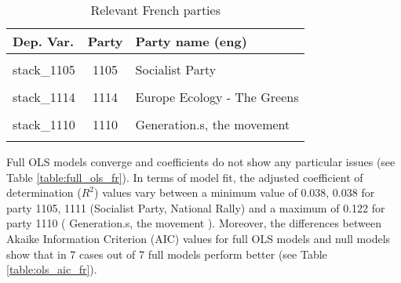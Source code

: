 \documentclass[
]{article}
\begin{document}
\begin{table}[!h]

\caption{\label{tab:unnamed-chunk-67}Relevant French parties \label{table:relprty_tab_fr}}
\centering
\begin{tabular}[t]{lcl}
\toprule
Dep. Var. & Party & Party name (eng)\\
\midrule
\cellcolor{gray!6}{stack\_1113} & \cellcolor{gray!6}{1113} & \cellcolor{gray!6}{The Republicans}\\
stack\_1105 & 1105 & Socialist Party\\
\cellcolor{gray!6}{stack\_1111} & \cellcolor{gray!6}{1111} & \cellcolor{gray!6}{National Rally}\\
stack\_1114 & 1114 & Europe Ecology - The Greens\\
\cellcolor{gray!6}{stack\_1101} & \cellcolor{gray!6}{1101} & \cellcolor{gray!6}{Unbowed France}\\
\addlinespace
stack\_1110 & 1110 & Generation.s, the movement\\
\cellcolor{gray!6}{stack\_1102} & \cellcolor{gray!6}{1102} & \cellcolor{gray!6}{The Republic Onwards!}\\
\bottomrule
\end{tabular}
\end{table}

Full OLS models converge and coefficients do not show any particular issues (see Table
\ref{table:full_ols_fr}).
In terms of model fit, the adjusted coefficient of determination (\(R^2\)) values vary between
a minimum value of 0.038, 0.038
for party 1105, 1111
(Socialist Party, National Rally)
and a maximum of 0.122
for party 1110
( Generation.s, the movement ).
Moreover, the differences between Akaike Information Criterion (AIC) values for full OLS models and null
models show that in 7 cases out of 7 full models perform better (see Table
\ref{table:ols_aic_fr}).
\end{document}
